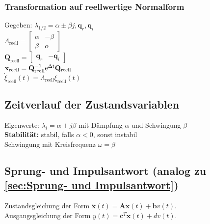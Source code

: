 \documentclass[fs, footer]{latex4ei}
\begin{document}
\begin{multicols*}{4}
\subsubsection{Transformation auf reellwertige Normalform}
Gegeben: $\lambda_{1/2} = \alpha \pm \beta j, \mathbf{q}_r, \mathbf{q}_i$\\
$\Lambda_\text{reell} =  \begin{bmatrix} \alpha & - \beta \\ \beta & \alpha \end{bmatrix}$\\
$\mathbf{Q}_\text{reell} = \begin{bmatrix} \mathbf{q}_r & - \mathbf{q}_i \end{bmatrix}$\\
$\mathbf{x}_\text{reell} = \mathbf{Q}_\text{reell}^{-1} \mathrm{e}^{\Delta t}\mathbf{Q}_\text{reell}$\\
$\dot{\xi}_\text{reell} (t) = \Lambda_\text{reell}\xi_\text{reell}(t)$\\
\subsection{Zeitverlauf der Zustandsvariablen}
Eigenwerte: $\lambda_i = \alpha + j\beta$ mit Dämpfung $\alpha$ und Schwingung $\beta$\\
\textbf{Stabilität:} stabil, falls $\alpha < 0$, sonst instabil\\
Schwingung mit Kreisfrequenz $\omega = \beta$\\
\subsection{Sprung- und Impulsantwort (analog zu \ref{sec:Sprung- und Impulsantwort})}
Zustandsgleichung der Form $\dot{\mathbf{x}}(t) = \mathbf{A}\mathbf{x}(t)+\mathbf{b}v(t)$.\\
Ausgangsgleichung der Form $y(t) = \mathbf{c}^T\mathbf{x}(t) + dv(t)$.

\end{multicols*}
\end{document}
